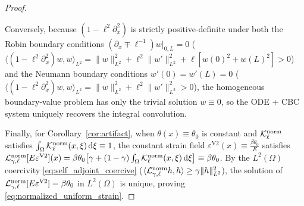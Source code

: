 \begin{proof}
\begin{enumerate}[label=(\alph*),leftmargin=*]
\end{enumerate}
Conversely, because $(1-\ell^2\partial_x^2)$ is strictly positive-definite under both the Robin boundary conditions $(\partial_x \mp \ell^{-1})w\big|_{0,L} = 0$ ($\langle(1-\ell^2\partial_x^2)w,w\rangle_{L^2} = \|w\|_{L^2}^2 + \ell^2\|w'\|_{L^2}^2 + \ell[w(0)^2 + w(L)^2] > 0$) and the Neumann boundary conditions $w'(0) = w'(L) = 0$ ($\langle(1-\ell^2\partial_x^2)w,w\rangle_{L^2} = \|w\|_{L^2}^2 + \ell^2\|w'\|_{L^2}^2 > 0$), the homogeneous boundary-value problem has only the trivial solution $w \equiv 0$, so the ODE + CBC system uniquely recovers the integral convolution.

Finally, for Corollary~\ref{cor:artifact}, when $\theta(x) \equiv \theta_0$ is constant and $\mathcal{K}_\ell^{\mathrm{norm}}$ satisfies $\int_\Omega \mathcal{K}_\ell^{\mathrm{norm}}(x,\xi)\,\mathrm{d}\xi \equiv 1$, the constant strain field $\varepsilon^{\mathrm{V2}}(x) \equiv \frac{\beta\theta_0}{E}$ satisfies $\mathcal{L}_{\gamma,\ell}^{\mathrm{norm}}[E\varepsilon^{\mathrm{V2}}](x) = \beta\theta_0\big[\gamma + (1-\gamma)\int_\Omega \mathcal{K}_\ell^{\mathrm{norm}}(x,\xi)\,\mathrm{d}\xi\big] \equiv \beta\theta_0$. By the $L^2(\Omega)$ coercivity \eqref{eq:self_adjoint_coercive} ($\langle\mathcal{L}_{\gamma,\ell}^{\mathrm{norm}}h,h\rangle \ge \gamma\|h\|_{L^2}^2$), the solution of $\mathcal{L}_{\gamma,\ell}^{\mathrm{norm}}[E\varepsilon^{\mathrm{V2}}] = \beta\theta_0$ in $L^2(\Omega)$ is unique, proving \eqref{eq:normalized_uniform_strain}.
\end{proof}
